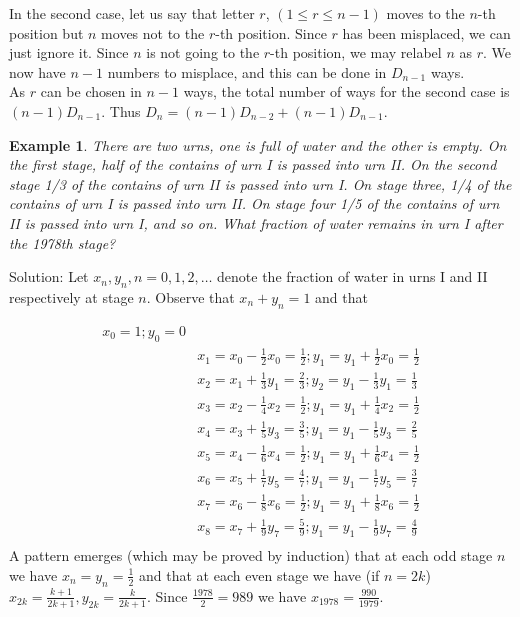 \documentclass[11pt, openany]{book}
\theoremstyle{change} \theoremheaderfont{\blue\sffamily\bfseries}
\newtheorem{exa}[thm]{Example}
\theoremstyle{nonumberplain} \theoremheaderfont{\sffamily\bfseries}
\newcommand{\í}{\'{\i}}
\begin{document}
In the second case, let us say that letter $r$, $(1 \leq r \leq n
- 1)$ moves to the $n$-th position but $n$ moves not to the $r$-th
position.  Since $r$ has been misplaced, we can just ignore it.
Since $n$ is not going to the $r$-th position, we may relabel $n$
as $r$.  We now have $n - 1$ numbers to misplace, and this can be
done in
$D_{n - 1}$ ways.\\
As $r$ can be chosen in $n - 1$ ways, the total number of ways for
the second case is $(n - 1)D_{n - 1}.$  Thus $D_n = (n - 1)D_{n -
2} + (n - 1)D_{n - 1}.$

\begin{exa}
There are two urns, one is full of water and the other is empty.
On the first stage, half of the contains of urn I is passed into
urn II. On the second stage 1/3 of the contains of urn II is
passed into urn I. On stage three, 1/4 of the contains of urn I is
passed into urn II. On stage four 1/5 of the contains of urn II is
passed into urn I, and so on. What fraction of water remains in
urn I after the 1978th stage?

\end{exa}
Solution: Let $x_n, y_n, n = 0, 1, 2, \ldots$ denote the fraction
of water in urns I and II respectively at stage $n$. Observe that
$x_n + y_n = 1$ and that
\renewcommand{\arraystretch}{2}

$$
\begin{array}{ll}
x_0 = 1;  y_0 = 0 &  \\
& x_1 = x_0 - \frac{1}{2}x_0 = \frac{1}{2}; y_1 = y_1 + \frac{1}{2}x_0 = \frac{1}{2}\\
& x_2 = x_1 + \frac{1}{3}y_1 = \frac{2}{3}; y_2 = y_1 - \frac{1}{3}y_1 = \frac{1}{3} \\
& x_3 = x_2 - \frac{1}{4}x_2 = \frac{1}{2}; y_1 = y_1 + \frac{1}{4}x_2 = \frac{1}{2} \\
& x_4 = x_3 + \frac{1}{5}y_3 = \frac{3}{5}; y_1 = y_1 - \frac{1}{5}y_3 = \frac{2}{5} \\
& x_5 = x_4 - \frac{1}{6}x_4 = \frac{1}{2}; y_1 = y_1 + \frac{1}{6}x_4 = \frac{1}{2} \\
& x_6 = x_5 + \frac{1}{7}y_5 = \frac{4}{7}; y_1 = y_1 - \frac{1}{7}y_5 = \frac{3}{7} \\
& x_7 = x_6 - \frac{1}{8}x_6 = \frac{1}{2}; y_1 = y_1 + \frac{1}{8}x_6 = \frac{1}{2} \\
& x_8 = x_7 + \frac{1}{9}y_7 = \frac{5}{9}; y_1 = y_1 - \frac{1}{9}y_7 = \frac{4}{9} \\
\end{array}
$$
A pattern emerges (which may be proved by induction) that at each
odd stage $n$ we have $x_n = y_n = \frac{1}{2}$ and that at each
even stage we have (if $n = 2k$) $x_{2k} = \frac{k + 1}{2k + 1},
y_{2k} = \frac{k}{2k + 1}$. Since $\frac{1978}{2} = 989$ we have
$x_{1978} = \frac{990}{1979}$.
\end{document}
